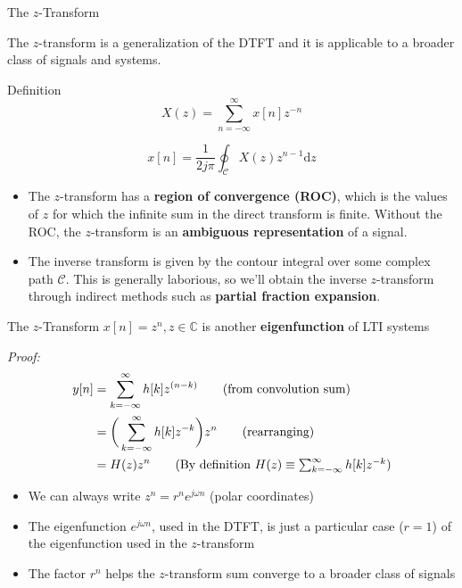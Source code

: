 \documentclass[10pt]{beamer}
\begin{document}
\begin{frame}{The $z$-Transform}

The $z$-transform is a generalization of the DTFT and it is applicable to a broader class of signals and systems.

\begin{block}{Definition}
	\begin{equation} \tag{Direct transform}
	X(z) = \sum_{n=-\infty}^{\infty} x[n]z^{-n} 
	\end{equation}
	
	\begin{equation}\tag{Inverse transform}
	x[n] = \frac{1}{2j\pi}\oint_{\mathcal{C}}X(z)z^{n-1}\mathrm{d}z
	\end{equation}
\end{block}

\begin{itemize}
	\item The $z$-transform has a \textbf{region of convergence (ROC)}, which is the values of $z$ for which the infinite sum in the direct transform is finite. Without the ROC, the $z$-transform is an \textbf{ambiguous representation} of a signal.
	\item The inverse transform is given by the contour integral over some complex path $\mathcal{C}$. This is generally laborious, so we'll obtain the inverse $z$-transform through indirect methods such as \textbf{partial fraction expansion}.
\end{itemize}
\end{frame}

%
\begin{frame}{The $z$-Transform}
$x[n] = z^n, z\in\mathbb{C}$ is another \textbf{eigenfunction} of LTI systems

\textit{Proof:}
\begin{align*}
y[n] &= \sum_{k=-\infty}^{\infty} h[k]z^{(n-k)} \tag{from convolution sum} \\
&= \bigg(\sum_{k=-\infty}^{\infty} h[k]z^{-k}\bigg)z^{n} \tag{rearranging}\\
&= H(z)z^{n} \tag{By definition $H(z) \equiv \sum_{k=-\infty}^{\infty} h[k]z^{-k}$}
\end{align*}	

\begin{itemize}
	\item We can always write $z^n = r^ne^{j\omega n}$ (polar coordinates)
	\item The eigenfunction $e^{j\omega n}$, used in the DTFT, is just a particular case ($r=1$) of the eigenfunction used in the $z$-transform
	\item The factor $r^n$ helps the $z$-transform sum converge to a broader class of signals
\end{itemize}

\end{frame}
\end{document}
